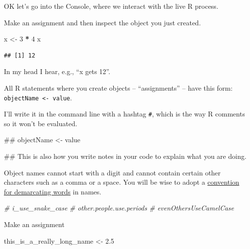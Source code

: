 \documentclass[]{book}
\newenvironment{Shaded}{\begin{snugshade}}{\end{snugshade}}
\newcommand{\DecValTok}[1]{\textcolor[rgb]{0.00,0.00,0.81}{#1}}
\newcommand{\FloatTok}[1]{\textcolor[rgb]{0.00,0.00,0.81}{#1}}
\newcommand{\StringTok}[1]{\textcolor[rgb]{0.31,0.60,0.02}{#1}}
\newcommand{\CommentTok}[1]{\textcolor[rgb]{0.56,0.35,0.01}{\textit{#1}}}
\newcommand{\OperatorTok}[1]{\textcolor[rgb]{0.81,0.36,0.00}{\textbf{#1}}}
\newcommand{\NormalTok}[1]{#1}
\theoremstyle{definition}
\theoremstyle{definition}
\theoremstyle{definition}
\theoremstyle{remark}
\begin{document}
OK let's go into the Console, where we interact with the live R process.

Make an assignment and then inspect the object you just created.

\begin{Shaded}
\begin{Highlighting}[]
\NormalTok{x <-}\StringTok{ }\DecValTok{3} \OperatorTok{*}\StringTok{ }\DecValTok{4}
\NormalTok{x}
\end{Highlighting}
\end{Shaded}

\begin{verbatim}
## [1] 12
\end{verbatim}

In my head I hear, e.g., ``x gets 12''.

All R statements where you create objects -- ``assignments'' -- have
this form: \texttt{objectName\ \textless{}-\ value}.

I'll write it in the command line with a hashtag \texttt{\#}, which is
the way R comments so it won't be evaluated.

\begin{Shaded}
\begin{Highlighting}[]
\NormalTok{## objectName <- value}

\NormalTok{## This is also how you write notes in your code to explain what you are doing.}
\end{Highlighting}
\end{Shaded}

Object names cannot start with a digit and cannot contain certain other
characters such as a comma or a space. You will be wise to adopt a
\href{http://en.wikipedia.org/wiki/Snake_case}{convention for
demarcating words} in names.

\begin{Shaded}
\begin{Highlighting}[]
\CommentTok{# i_use_snake_case}
\CommentTok{# other.people.use.periods}
\CommentTok{# evenOthersUseCamelCase}
\end{Highlighting}
\end{Shaded}

Make an assignment

\begin{Shaded}
\begin{Highlighting}[]
\NormalTok{this_is_a_really_long_name <-}\StringTok{ }\FloatTok{2.5}
\end{Highlighting}
\end{Shaded}
\end{document}
